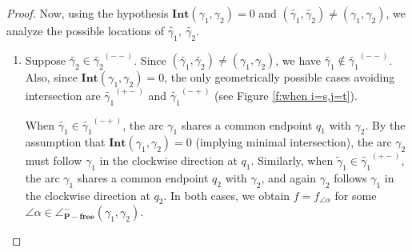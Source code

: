 \documentclass[a4paper,10pt]{amsart}
\theoremstyle{plain}          %
\theoremstyle{definition}
\newcommand{\Int}{\mathbf{Int}}
\newcommand{\apfree}{\angle^-_{\mathbf{P-free}}}
\begin{document}
\begin{proof}
Now, using the hypothesis $\Int(\gamma_1,\gamma_2)=0$ and $(\widetilde{\gamma_1},\widetilde{\gamma_2})\neq {(\gamma_1,\gamma_2)}$, we analyze the possible locations of $\widetilde{\gamma_1},~\widetilde{\gamma_2}$. 
\begin{enumerate}
\item Suppose $\widetilde{\gamma_2}\in\widetilde{\gamma_2}^{(--)}$. Since 
$(\widetilde{\gamma_1},\widetilde{\gamma_2})\neq {(\gamma_1,\gamma_2)}$,
we have $\widetilde{\gamma_1}\notin\widetilde{\gamma_1}^{(--)}$. Also, since $\Int(\gamma_1,\gamma_2)=0$,  the only geometrically possible cases avoiding intersection are $\widetilde{\gamma_1}^{(+-)}$ and $\widetilde{\gamma_1}^{(-+)}$ (see Figure \ref{f:when i=s,j=t}).

When $\widetilde{\gamma_1}\in \widetilde{\gamma_1}^{(-+)}$, the arc $\gamma_1$ shares a common endpoint $q_1$ with $\gamma_2$. By the assumption that $\Int(\gamma_1, \gamma_2) = 0$ (implying minimal intersection), the arc $\gamma_2$ must follow $\gamma_1$ in the clockwise direction at $q_1$. Similarly, when $\widetilde{\gamma}_1 \in \widetilde{\gamma_1}^{(+-)}$, the arc $\gamma_1$ shares a common endpoint $q_2$ with $\gamma_2$, and again $\gamma_2$ follows $\gamma_1$ in the clockwise direction at $q_2$. In both cases, we obtain $f=f_{\angle\alpha}$ for some $\angle\alpha\in\apfree(\gamma_1,\gamma_2)$. 


\end{enumerate}
\end{proof}
\end{document}
